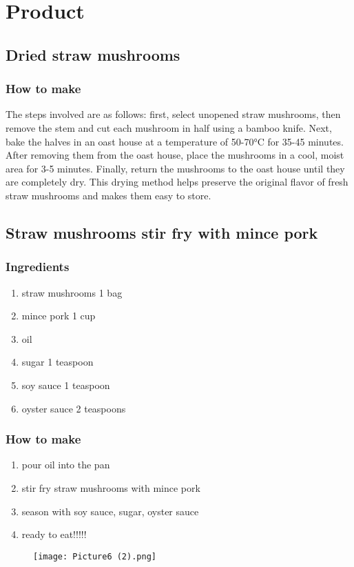 \chapter{Product}
\section{Dried straw mushrooms}
\subsection{How to make}
The steps involved are as follows: first, select unopened straw mushrooms, then remove the stem and cut each mushroom in half using a bamboo knife. Next, bake the halves in an oast house at a temperature of 50-70°C for 35-45 minutes. After removing them from the oast house, place the mushrooms in a cool, moist area for 3-5 minutes. Finally, return the mushrooms to the oast house until they are completely dry. This drying method helps preserve the original flavor of fresh straw mushrooms and makes them easy to store.
\section{Straw mushrooms stir fry with mince pork}
\subsection{Ingredients}
\begin{enumerate}
    \item straw mushrooms  1 bag
    \item mince pork  1 cup
    \item oil  
    \item sugar  1 teaspoon
    \item soy sauce  1 teaspoon
    \item oyster sauce  2 teaspoons
\end{enumerate}
\subsection{How to make}
\begin{enumerate}
    \item pour oil into the pan
    \item stir fry straw mushrooms with mince pork
    \item season with soy sauce, sugar, oyster sauce
    \item ready to eat!!!!!
\end{enumerate}
\begin{figure}[h]
    \texttt{[image: Picture6 (2).png]}
\end{figure}
